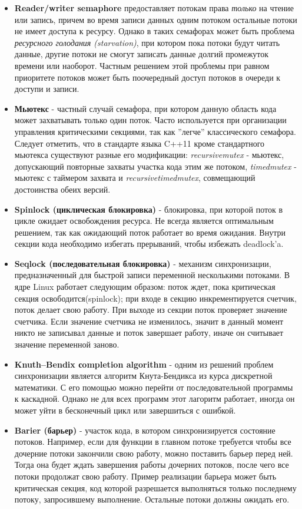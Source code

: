 {\begin{itemize}
			\item\textbf{Reader/writer semaphore} предоставляет потокам права \textit{только} на чтение или запись, причем во время записи данных одним потоком остальные потоки не имеет доступа к ресурсу. Однако в таких семафорах может быть проблема \textit{ресурсного голодания (starvation)}, при котором пока потоки будут читать данные, другие потоки не смогут записать данные долгий промежуток времени или наоборот. Частным решением этой проблемы при равном приоритете потоков может быть поочередный доступ потоков в очереди к доступи и записи.
			\item\textbf{Мьютекс} - частный случай семафора, при котором данную область кода может захватывать только один поток. Часто используется при организации управления критическими секциями, так как ''легче'' классического семафора. Следует отметить, что в стандарте языка C++11 кроме стандартного мьютекса существуют разные его модификации:  \textit{recursive\textunderscore mutex} - мьютекс, допускающий повторные захваты участка кода этим же потоком, \textit{timed\textunderscore mutex} - мьютекс с таймером захвата и  \textit{recursive\textunderscore timed\textunderscore mutex}, совмещающий достоинства обеих версий.
			\item\textbf{Spinlock (циклическая блокировка)} - блокировка, при которой поток в цикле ожидает освобождения ресурса. Не всегда является оптимальным решением, так как ожидающий поток работает во время ожидания. Внутри секции кода необходимо избегать прерываний, чтобы избежать deadlock'a.
			\item\textbf{Seqlock (последовательная блокировка)} - механизм синхронизации, предназначенный для быстрой записи переменной несколькими потоками. В ядре Linux работает следующим образом: поток ждет, пока критическая секция освободится(spinlock); при входе в секцию инкрементируется счетчик, поток делает свою работу. При выходе из секции поток проверяет значение счетчика. Если значение счетчика не изменилось, значит в данный момент никто не записывал данные и поток завершает работу, иначе он считывает значение переменной заново.
			\item\textbf{Knuth–Bendix сompletion algorithm} - одним из решений проблем синхронизации является алгоритм Кнута-Бендикса из курса дискретной математики. С его помощью можно перейти от последовательной программы к каскадной. Однако не для всех программ этот лагоритм работает, иногда он может уйти в бесконечный цикл или завершиться с ошибкой.
			\item\textbf{Barier (барьер)} - участок кода, в котором синхронизируется состояние потоков. Например, если для функции в главном потоке требуется чтобы все дочерние потоки закончили свою работу, можно поставить барьер перед ней. Тогда она будет ждать завершения работы дочерних потоков, после чего все потоки продолжат свою работу. Пример реализации барьера может быть критическая секция, код которой разрешается выполняться только последнему потоку, запросившему выполнение. Остальные потоки должны ожидать его.

\end{itemize}}
